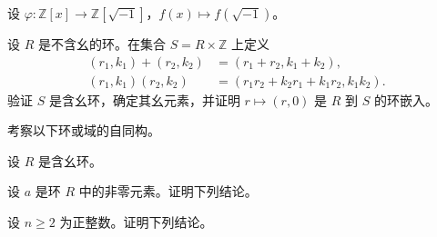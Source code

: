 \noindent\begin{minipage}{\textwidth}
设 $\varphi\colon\mathbb{Z}[x]\to\mathbb{Z}[\sqrt{-1}]$，$f(x)\mapsto f(\sqrt{-1})$。
\end{minipage}\par\vfill
\noindent\begin{minipage}{\textwidth}
设 $R$ 是不含幺的环。在集合 $S=R\times\mathbb{Z}$ 上定义
\[
\begin{aligned}
(r_1,k_1)+(r_2,k_2)&=(r_1+r_2,k_1+k_2),\\
(r_1,k_1)(r_2,k_2)&=(r_1r_2+k_2r_1+k_1r_2,k_1k_2).
\end{aligned}
\]
验证 $S$ 是含幺环，确定其幺元素，并证明 $r\mapsto(r,0)$ 是 $R$ 到 $S$ 的环嵌入。
\end{minipage}\par\vfill
\newpage
\noindent\begin{minipage}{\textwidth}
考察以下环或域的自同构。
\end{minipage}\par\vfill
\noindent\begin{minipage}{\textwidth}
设 $R$ 是含幺环。
\end{minipage}\par\vfill
\noindent\begin{minipage}{\textwidth}
设 $a$ 是环 $R$ 中的非零元素。证明下列结论。
\end{minipage}\par\vfill
\newpage
\noindent\begin{minipage}{\textwidth}
设 $n\ge 2$ 为正整数。证明下列结论。
\end{minipage}\par\vfill
